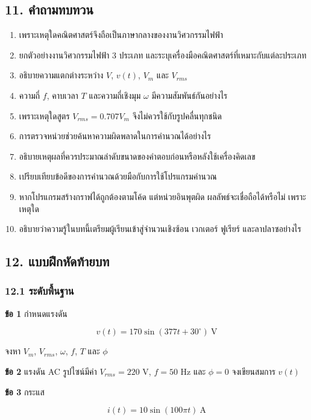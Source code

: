  

\subsection{11. คำถามทบทวน}

\begin{enumerate}
    \item เพราะเหตุใดคณิตศาสตร์จึงถือเป็นภาษากลางของงานวิศวกรรมไฟฟ้า
    \item ยกตัวอย่างงานวิศวกรรมไฟฟ้า 3 ประเภท และระบุเครื่องมือคณิตศาสตร์ที่เหมาะกับแต่ละประเภท
    \item อธิบายความแตกต่างระหว่าง $V$, $v(t)$, $V_m$ และ $V_{rms}$
    \item ความถี่ $f$, คาบเวลา $T$ และความถี่เชิงมุม $\omega$ มีความสัมพันธ์กันอย่างไร
    \item เพราะเหตุใดสูตร $V_{rms}=0.707V_m$ จึงไม่ควรใช้กับรูปคลื่นทุกชนิด
    \item การตรวจหน่วยช่วยค้นหาความผิดพลาดในการคำนวณได้อย่างไร
    \item อธิบายเหตุผลที่ควรประมาณลำดับขนาดของคำตอบก่อนหรือหลังใช้เครื่องคิดเลข
    \item เปรียบเทียบข้อดีของการคำนวณด้วยมือกับการใช้โปรแกรมคำนวณ
    \item หากโปรแกรมสร้างกราฟได้ถูกต้องตามโค้ด แต่หน่วยอินพุตผิด ผลลัพธ์จะเชื่อถือได้หรือไม่ เพราะเหตุใด
    \item อธิบายว่าความรู้ในบทนี้เตรียมผู้เรียนเข้าสู่จำนวนเชิงซ้อน เวกเตอร์ ฟูเรียร์ และลาปลาซอย่างไร
\end{enumerate}

 

\subsection{12. แบบฝึกหัดท้ายบท}

\subsubsection{12.1 ระดับพื้นฐาน}

\textbf{ข้อ 1} กำหนดแรงดัน

\[
v(t)=170\sin(377t+30^\circ)\ \mathrm{V}
\]

จงหา $V_m$, $V_{rms}$, $\omega$, $f$, $T$ และ $\phi$

\textbf{ข้อ 2} แรงดัน AC รูปไซน์มีค่า $V_{rms}=220$ V, $f=50$ Hz และ $\phi=0$ จงเขียนสมการ $v(t)$

\textbf{ข้อ 3} กระแส

\[
i(t)=10\sin(100\pi t)\ \mathrm{A}
\]

